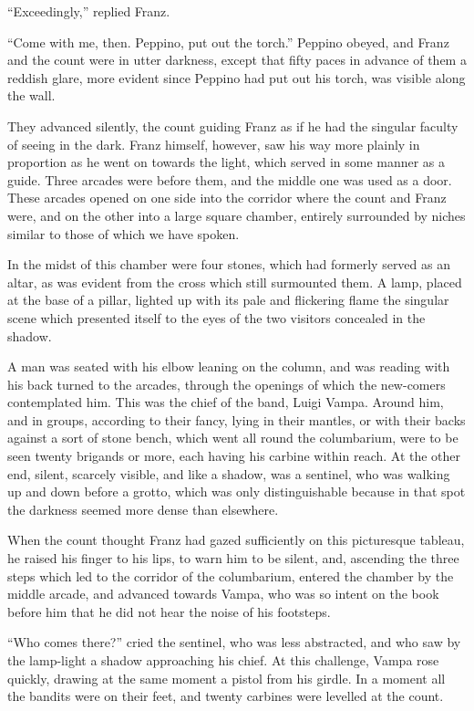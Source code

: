 “Exceedingly,” replied Franz.

“Come with me, then. Peppino, put out the torch.” Peppino obeyed, and
Franz and the count were in utter darkness, except that fifty paces in
advance of them a reddish glare, more evident since Peppino had put out
his torch, was visible along the wall.

They advanced silently, the count guiding Franz as if he had the
singular faculty of seeing in the dark. Franz himself, however, saw his
way more plainly in proportion as he went on towards the light, which
served in some manner as a guide. Three arcades were before them, and
the middle one was used as a door. These arcades opened on one side
into the corridor where the count and Franz were, and on the other into
a large square chamber, entirely surrounded by niches similar to those
of which we have spoken.

In the midst of this chamber were four stones, which had formerly
served as an altar, as was evident from the cross which still
surmounted them. A lamp, placed at the base of a pillar, lighted up
with its pale and flickering flame the singular scene which presented
itself to the eyes of the two visitors concealed in the shadow.

A man was seated with his elbow leaning on the column, and was reading
with his back turned to the arcades, through the openings of which the
new-comers contemplated him. This was the chief of the band, Luigi
Vampa. Around him, and in groups, according to their fancy, lying in
their mantles, or with their backs against a sort of stone bench, which
went all round the columbarium, were to be seen twenty brigands or
more, each having his carbine within reach. At the other end, silent,
scarcely visible, and like a shadow, was a sentinel, who was walking up
and down before a grotto, which was only distinguishable because in
that spot the darkness seemed more dense than elsewhere.

When the count thought Franz had gazed sufficiently on this picturesque
tableau, he raised his finger to his lips, to warn him to be silent,
and, ascending the three steps which led to the corridor of the
columbarium, entered the chamber by the middle arcade, and advanced
towards Vampa, who was so intent on the book before him that he did not
hear the noise of his footsteps.

“Who comes there?” cried the sentinel, who was less abstracted, and who
saw by the lamp-light a shadow approaching his chief. At this
challenge, Vampa rose quickly, drawing at the same moment a pistol from
his girdle. In a moment all the bandits were on their feet, and twenty
carbines were levelled at the count.

